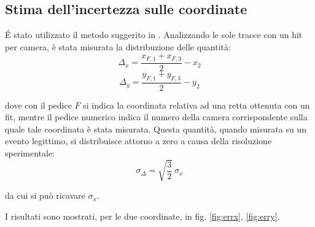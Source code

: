 \documentclass[8pt]{extarticle}
\begin{document}
\subsection{Stima dell'incertezza sulle coordinate} \label{subsec:coord_err}
\'E stato utilizzato il metodo suggerito in \cite{articolo_EEE}. Analizzando le sole tracce con un hit per camera, è stata misurata la distribuzione delle quantità: \\

\[ \Delta_x = \frac{x_{F,1} + x_{F,3}}{2} - x_2 \]
\[ \Delta_y = \frac{y_{F,1} + y_{F,3}}{2} - y_2 \]

dove con il pedice $F$ si indica la coordinata relativa ad una retta ottenuta con un fit, mentre il pedice numerico indica il numero della camera corrispondente sulla quale tale coordinata è stata misurata. Questa quantità, quando misurata su un evento legittimo, si distribuisce attorno a zero a causa della risoluzione sperimentale: \\

\[ \sigma_\Delta = \sqrt{\frac{3}{2}} \ \sigma_x  \]

da cui si può ricavare $\sigma_x$.

I risultati sono mostrati, per le due coordinate, in fig. \ref{fig:errx}, \ref{fig:erry}.
\end{document}
